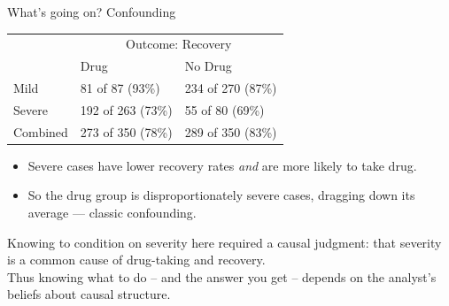 \documentclass[xcolor=dvipsnames]{beamer}
\begin{document}
\begin{frame}{What's going on? Confounding}
\begin{table}[]
\begin{tabular}{lll}
                              & \multicolumn{2}{c}{Outcome:  Recovery}                                                                  \\
                              & Drug                                               & No Drug                                            \\ \cline{2-3}
\multicolumn{1}{l|}{Mild}     & \multicolumn{1}{l|}{81 of 87 (93\%)}   & \multicolumn{1}{l|}{234 of 270  (87\%)} \\ \cline{2-3}
\multicolumn{1}{l|}{Severe}   & \multicolumn{1}{l|}{192 of 263 (73\%)} & \multicolumn{1}{l|}{55 of 80  (69\%)}   \\ \cline{2-3}
\multicolumn{1}{l|}{Combined} & \multicolumn{1}{l|}{273 of 350 (78\%)}  & \multicolumn{1}{l|}{289 of 350 (83\%)} \\ \cline{2-3}
\end{tabular}
\end{table}
\medskip
\small
\begin{itemize}
\item<2-> Severe cases have lower recovery rates \textit{and} are more likely to take drug.
\item<4-> So the drug group is disproportionately severe cases, dragging down its average --- classic confounding.
\end{itemize}
 Knowing to condition on severity here required a causal judgment: that severity is a common cause of drug-taking and recovery. \\
\medskip
{} Thus knowing what to do -- and the answer you get -- depends on the analyst's beliefs about causal structure.\\
\end{frame}
\end{document}
